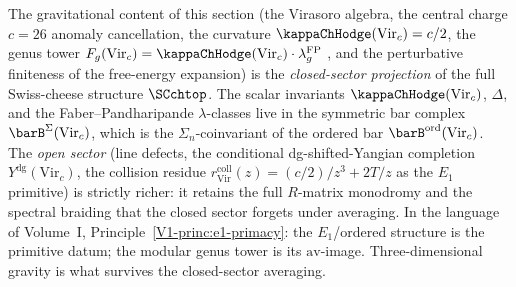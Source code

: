 \begin{remark}
\label{rem:gravity-closed-sector-projection}
The gravitational content of this section (the Virasoro algebra,
the central charge $c = 26$ anomaly cancellation, the curvature
$\kappaChHodge(\mathrm{Vir}_c) = c/2$, the genus tower
$F_g(\mathrm{Vir}_c) = \kappaChHodge(\mathrm{Vir}_c) \cdot
\lambda_g^{\mathrm{FP}}$ ,
and the perturbative finiteness of
the free-energy expansion) is the
\emph{closed-sector projection} of the full Swiss-cheese
structure $\SCchtop$. The scalar invariants
$\kappaChHodge(\mathrm{Vir}_c)$, $\Delta$,
and the Faber--Pandharipande $\lambda$-classes live in the
symmetric bar complex $\barB^{\Sigma}(\mathrm{Vir}_c)$, which is
the $\Sigma_n$-coinvariant of the ordered bar
$\barB^{\mathrm{ord}}(\mathrm{Vir}_c)$. The \emph{open sector}
(line defects, the conditional dg-shifted-Yangian completion
\(Y^{\mathrm{dg}}(\mathrm{Vir}_c)\), the collision residue
\(r_{\mathrm{Vir}}^{\mathrm{coll}}(z) = (c/2)/z^3 + 2T/z\) as the \(E_1\)
primitive) is strictly
richer: it retains the full $R$-matrix monodromy and the spectral
braiding that the closed sector forgets under averaging. In the
language of
Volume~I, Principle~\textup{\ref*{V1-princ:e1-primacy}}:
the $E_1$/ordered structure is the primitive datum; the modular
genus tower is its $\mathrm{av}$-image. Three-dimensional
gravity is what survives the closed-sector averaging.
\end{remark}

